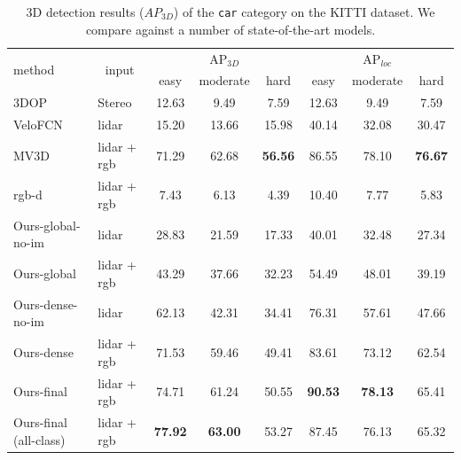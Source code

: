 \documentclass[10pt,twocolumn,letterpaper]{article}
\begin{document}
\begin{table}[!t]
\centering
\caption{3D detection results ($AP_{3D}$) of the \texttt{car} category on the KITTI dataset. We compare against a number of state-of-the-art models. }
\label{table:kitti-car-supp}
\begin{tabular}{|l|l|ccc|ccc|}
\hline
\multirow{2}{*}{method} & \multicolumn{1}{c|}{\multirow{2}{*}{input}} & \multicolumn{3}{c|}{AP$_{3D}$} & \multicolumn{3}{c|}{AP$_{loc}$}  \\ \cline{3-8} 
                        & \multicolumn{1}{c|}{}                       & easy     & moderate   & hard    & easy     & moderate   & hard       \\ \hline
3DOP\cite{3dop}         & Stereo                                      & 12.63    & 9.49       & 7.59    & 12.63    & 9.49       & 7.59          \\
VeloFCN\cite{velofcn}   & lidar                                       & 15.20    & 13.66      & 15.98   & 40.14    & 32.08      & 30.47       \\
MV3D~\cite{mv3d}        & lidar + rgb                                 & 71.29    & 62.68      & \textbf{56.56}   & 86.55    & 78.10      & \textbf{76.67}     \\
rgb-d                    & lidar + rgb                                & 7.43     & 6.13       & 4.39    & 10.40    & 7.77       & 5.83      \\
Ours-global-no-im       & lidar                                       & 28.83    & 21.59      & 17.33   & 40.01    & 32.48      & 27.34   \\
Ours-global             & lidar + rgb                                 & 43.29    & 37.66      & 32.23   & 54.49    & 48.01      & 39.19    \\
Ours-dense-no-im        & lidar                                       & 62.13    & 42.31      & 34.41   & 76.31    & 57.61      & 47.66    \\
Ours-dense              & lidar + rgb                                 & 71.53    & 59.46      & 49.41   & 83.61    & 73.12      & 62.54    \\
Ours-final              & lidar + rgb                                 & 74.71    & 61.24      & 50.55   & \textbf{90.53}    & \textbf{78.13}      & 65.41   \\
Ours-final (all-class)  & lidar + rgb                                 & \textbf{77.92}    & \textbf{63.00}      & 53.27   & 87.45    & 76.13      & 65.32   \\

\hline
\end{tabular}
\end{table}
\end{document}
